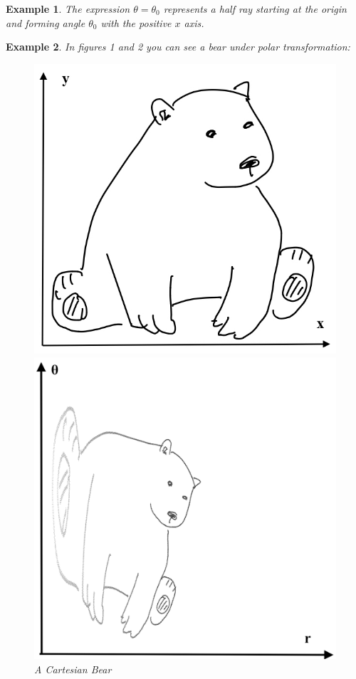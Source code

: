 \documentclass[12pt]{article}
\newtheorem{example}{Example}
\begin{document}
\begin{example} The expression $\theta = \theta_0$ represents a half ray starting at the origin and forming angle $\theta_0$ with the positive $x$ axis.
\end{example}
\begin{example} In figures 1 and 2 you can see a bear under polar transformation:

\begin{figure}
\centering
\parbox{5cm}{
\includegraphics[scale=.2]{cartesian_bear_with_axes.jpeg}
\caption{A Cartesian Bear}}
\label{cartesianbear}
\qquad
\begin{minipage}{5cm}
\includegraphics[scale=.1]{polar_bear.png}

\end{minipage}
\end{figure}
\end{example}
\end{document}
